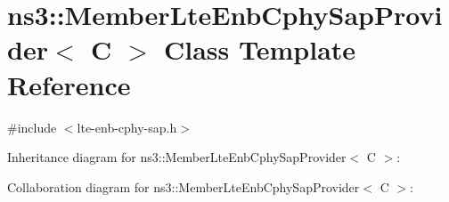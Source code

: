 \hypertarget{classns3_1_1MemberLteEnbCphySapProvider}{}\section{ns3\+:\+:Member\+Lte\+Enb\+Cphy\+Sap\+Provider$<$ C $>$ Class Template Reference}
\label{classns3_1_1MemberLteEnbCphySapProvider}


{\ttfamily \#include $<$lte-\/enb-\/cphy-\/sap.\+h$>$}



Inheritance diagram for ns3\+:\+:Member\+Lte\+Enb\+Cphy\+Sap\+Provider$<$ C $>$\+:


Collaboration diagram for ns3\+:\+:Member\+Lte\+Enb\+Cphy\+Sap\+Provider$<$ C $>$\+:
